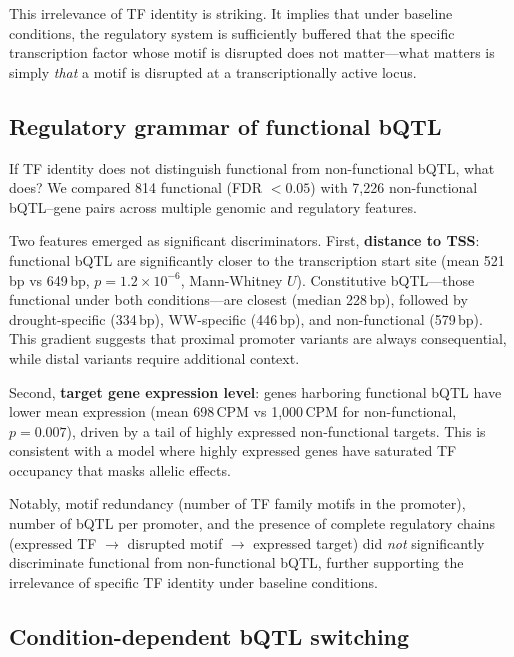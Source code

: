 \documentclass[10pt,letterpaper]{article}
\begin{document}
This irrelevance of TF identity is striking. It implies that under baseline
conditions, the regulatory system is sufficiently buffered that the specific
transcription factor whose motif is disrupted does not matter---what matters is
simply \emph{that} a motif is disrupted at a transcriptionally active locus.

\subsection*{Regulatory grammar of functional bQTL}

If TF identity does not distinguish functional from non-functional bQTL, what
does? We compared 814 functional (FDR $< 0.05$) with 7,226 non-functional
bQTL--gene pairs across multiple genomic and regulatory features.

Two features emerged as significant discriminators. First, \textbf{distance to
TSS}: functional bQTL are significantly closer to the transcription start site
(mean 521\,bp vs 649\,bp, $p = 1.2 \times 10^{-6}$, Mann-Whitney $U$).
Constitutive bQTL---those functional under both conditions---are closest
(median 228\,bp), followed by drought-specific (334\,bp), WW-specific
(446\,bp), and non-functional (579\,bp). This gradient suggests that proximal
promoter variants are always consequential, while distal variants require
additional context.

Second, \textbf{target gene expression level}: genes harboring functional bQTL
have lower mean expression (mean 698\,CPM vs 1,000\,CPM for non-functional,
$p = 0.007$), driven by a tail of highly expressed non-functional targets.
This is consistent with a model where highly expressed genes have saturated
TF occupancy that masks allelic effects.

Notably, motif redundancy (number of TF family motifs in the promoter),
number of bQTL per promoter, and the presence of complete regulatory chains
(expressed TF $\to$ disrupted motif $\to$ expressed target) did \emph{not}
significantly discriminate functional from non-functional bQTL, further
supporting the irrelevance of specific TF identity under baseline conditions.

\subsection*{Condition-dependent bQTL switching}
\end{document}

